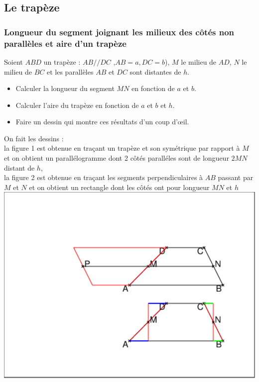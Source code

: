 \documentclass[a4paper,11pt]{book}
\begin{document}
\subsection{Le trap\`eze}
\subsubsection{Longueur du segment joignant les milieux des c\^ot\'es non parall\`eles et aire d'un trap\`eze}\index{}
Soient $ABD$ un trap\`eze : $AB//DC$ ,$AB=a,DC=b$), $M$ le milieu de $AD$, $N$ 
le milieu de $BC$ et les parall\`eles $AB$ et $DC$ sont distantes de $h$.
\begin{itemize}
\item Calculer la longueur du segment $MN$ en fonction de $a$ et $b$.
\item Calculer l'aire du trap\`eze en fonction de $a$ et $b$ et $h$.
\item  Faire un dessin qui montre ces r\'esultats d'un coup d'{\oe}il.
\end{itemize}
On fait les dessins  :\\
la figure 1 est obtenue en tra\c{c}ant un trap\`eze et son sym\'etrique par 
rapport \`a $M$ et on obtient un parall\'elogramme dont 2 c\^ot\'es parall\'eles
sont de longueur $2MN$  distant de $h$,\\
la figure 2  est obtenue en tra\c{c}ant les segments perpendiculaires \`a $AB$ 
passant par $M$ et $N$ et on obtient un rectangle dont les c\^ot\'es ont pour
 longueur $MN$ et $h$ \\
\includegraphics[width=\textwidth]{trapaire}\\
\end{document}
